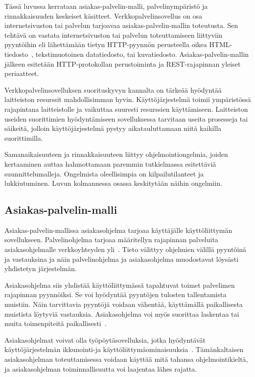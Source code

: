 \documentclass[finnish]{tktltiki2}%
\theoremstyle{definition}
\theoremstyle{remark}
\begin{document}
Tässä luvussa kerrataan
asiakas-palvelin-malli, palvelinympäristö ja rinnakkaisuuden keskeiset käsitteet.
Verkkopalvelinsovellus on osa internetsivuston tai palvelun tarjoavaa
asiakas-palvelin-mallin toteutusta. 
Sen tehtävä on vastata internetsivuston tai palvelun toteuttamiseen
liittyviin pyyntöihin eli lähettämään tietyn HTTP-pyynnön
perusteella oikea HTML-tiedosto~\cite{Berners-Lee_1994},
tekstimuotoinen datatiedosto, tai kuvatiedosto.
Asiakas-palvelin-mallin jälkeen esitetään
HTTP-protokollan perustoiminta ja REST-rajapinnan yleiset periaatteet.


Verkkopalvelinsovelluksen suorituskyvyn kannalta
on tärkeää hyödyntää laitteiston resurssit mahdollisimman hyvin.
Käyttöjärjestelmä toimii ympäristössä rajapintana
laitteistolle ja vaikuttaa suuresti resurssien
käyttämiseen. Laitteiston useiden
suorittimien hyödyntämiseen sovelluksessa tarvitaan useita
prosesseja tai säikeitä, jolloin käyttöjärjestelmä
pystyy aikatauluttamaan niitä kaikilla suorittimilla.

Samanaikaisuuteen ja rinnakkaisuuteen liittyy
ohjelmointiongelmia, joiden kertaaminen
auttaa hahmottamaan paremmin tutkielmassa
esitettäviä suunnittelumalleja. Ongelmista
oleellisimpia on kilpailutilanteet ja lukkiutuminen.
Luvun kolmannessa osassa
keskitytään näihin ongelmiin.

\subsection{Asiakas-palvelin-malli}
Asiakas-palvelin-mallissa
asiakasohjelma tarjoaa käyttäjälle käyttöliittymän sovellukseen. Palvelinohjelma
tarjoaa määritellyn rajapinnan
palveluita asiakasohjelmalle verkkoyhteyden yli~\cite{sinha_client-server_1992}.
Tieto välittyy ohjelmien välillä pyyntöinä ja vastauksina ja näin palvelinohjelma ja
asiakasohjelma
muodostavat löysästi yhdistetyn järjestelmän.

Asiakasohjelma siis yhdistää käyttöliittymässä tapahtuvat toimet palvelimen
rajapinnan pyynnöiksi. Se voi hyödyntää pyyntöjen tulosten tallentamista
muistiin. Näin tarvittavia pyyntöjä voidaan vähentää, käyttämällä
paikallisesta muistista löytyviä vastauksia.
Asiakasohjelma voi myös suorittaa
laskentaa tai muita toimenpiteitä paikallisesti~\cite{sinha_client-server_1992}.

Asiakasohjelmat voivat olla työpöytäsovelluksia, jotka hyödyntävät käyttöjärjestelmän
ikkunointi-ja käyttöliittymäominaisuuksia~\cite{sinha_client-server_1992}.
Tämänkaltaisen asiakasohjelman toteuttamisessa voidaan käyttää mitä tahansa ohjelmointikieltä,
ja asiakasohjelman toiminnallisuutta voi laajentaa lähes rajatta.
\end{document}

